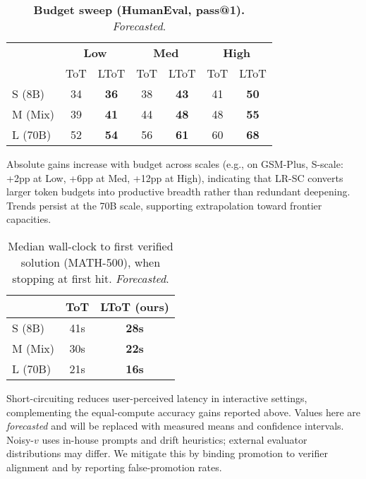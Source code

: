 \documentclass{article}
\begin{document}
\begin{table}[t]
\centering
\caption{\textbf{Budget sweep (HumanEval, pass@1).} \emph{Forecasted}.}
\vspace{0.3em}
\begin{tabular}{lcccccc}
\toprule
 & \multicolumn{2}{c}{\textbf{Low}} & \multicolumn{2}{c}{\textbf{Med}} & \multicolumn{2}{c}{\textbf{High}} \\
\cmidrule(lr){2-3}\cmidrule(lr){4-5}\cmidrule(lr){6-7}
 & ToT & LToT & ToT & LToT & ToT & LToT \\
\midrule
S (8B)  & 34 & \textbf{36} & 38 & \textbf{43} & 41 & \textbf{50} \\
M (Mix) & 39 & \textbf{41} & 44 & \textbf{48} & 48 & \textbf{55} \\
L (70B) & 52 & \textbf{54} & 56 & \textbf{61} & 60 & \textbf{68} \\
\bottomrule
\end{tabular}
\label{tab:budget-he}
\end{table}

Absolute gains increase with budget across scales (e.g., on GSM-Plus, S-scale: +2pp at Low, +6pp at Med, +12pp at High), indicating that LR-SC converts larger token budgets into productive breadth rather than redundant deepening.
Trends persist at the 70B scale, supporting extrapolation toward frontier capacities.

\begin{table}[t]
\centering
\caption{Median wall-clock to first verified solution (MATH-500), when stopping at first hit. \emph{Forecasted}.}
\vspace{0.3em}
\begin{tabular}{lcc}
\toprule
 & \textbf{ToT} & \textbf{LToT (ours)} \\
\midrule
S (8B)  & 41s & \textbf{28s} \\
M (Mix) & 30s & \textbf{22s} \\
L (70B) & 21s & \textbf{16s} \\
\bottomrule
\end{tabular}
\label{tab:latency}
\end{table}

Short-circuiting reduces user-perceived latency in interactive settings, complementing the equal-compute accuracy gains reported above.
Values here are \emph{forecasted} and will be replaced with measured means and confidence intervals.
Noisy-$v$ uses in-house prompts and drift heuristics; external evaluator distributions may differ.
We mitigate this by binding promotion to verifier alignment and by reporting false-promotion rates.
\end{document}
